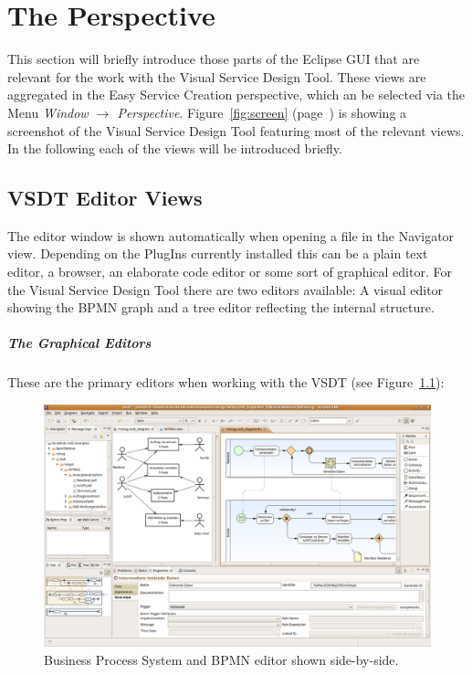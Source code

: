 \chapter{The Perspective}
\label{sec:user_perspective}

This section will briefly introduce those parts of the Eclipse GUI that are
relevant for the work with the Visual Service Design Tool.  These views are
aggregated in the Easy Service Creation perspective, which an be selected via the
Menu \emph{Window $\rightarrow$ Perspective}.  Figure~\ref{fig:screen}
(page~\pageref{fig:screen}) is showing a screenshot of the Visual Service Design
Tool featuring most of the relevant views.  In the following each of the views
will be introduced briefly.



\section{VSDT Editor Views}
\label{sec:user_perspective_editor}

The editor window is shown automatically when opening a file in the Navigator
view.  Depending on the PlugIns currently installed this can be a plain text
editor, a browser, an elaborate code editor or some sort of graphical editor.
For the Visual Service Design Tool there are two editors available: A visual
editor showing the BPMN graph and a tree editor reflecting the internal structure.

\paragraph*{The Graphical Editors}
These are the primary editors when working with the VSDT (see
Figure~\ref{fig:screen_meta}):

\begin{figure}
	\centering
	\includegraphics[height=.4\textheight]{figures/vsdt_1-3-0_uc.png}
	\caption{Business Process System and BPMN editor shown side-by-side.}
	\label{fig:screen_meta}
\end{figure}

